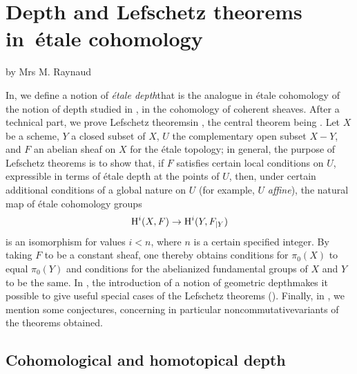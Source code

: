 \chapter[Depth and Lefschetz theorems]
{Depth and Lefschetz theorems in~\'{e}tale cohomology} \label{XIV}
\begin{center}
by Mrs M. Raynaud
\end{center}

\vspace*{1cm}
In\pageoriginale \numero {}, we define a notion of \og \textit{\'{e}tale depth}\fg that is the analogue in \'{e}tale cohomology of the notion of depth studied in , in the cohomology of coherent sheaves. After a technical part, we prove \og Lefschetz theorems\fg in \numero {}, the central theorem being . Let $X$ be a scheme, $Y$ a closed subset of $X$, $U$ the complementary open subset $X-Y$, and $F$ an abelian sheaf on $X$ for the \'{e}tale topology; in general, the purpose of Lefschetz theorems is to show that, if $F$ satisfies certain local conditions on $U$, expressible in terms of \'{e}tale depth at the points of $U$, then, under certain additional conditions of a global nature on $U$ (for example, $U$ \textit{affine}), the natural map of \'{e}tale cohomology groups
$$
\H^i(X, F)\to \H^i(Y, \sisi{F{|Y}}{F_{|Y}})$$
is an isomorphism for values $i<n$, where $n$ is a certain specified integer. By taking $F$ to be a constant sheaf, one thereby obtains conditions for $\pi_0(X)$ to equal $\pi_0(Y)$ and conditions for the abelianized fundamental groups of $X$ and $Y$ to be the same. In \numero {}, the introduction of a notion of \og geometric depth\fg makes it possible to give useful special cases of the Lefschetz theorems (). Finally, in \numero {}, we mention some conjectures, concerning in particular \og noncommutative\fg variants of the theorems obtained.

\section{Cohomological and homotopical depth}\label{XIV.1}

\setcounter{subsection}{-1}


